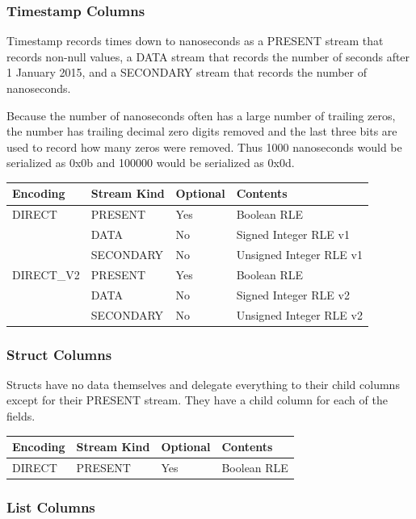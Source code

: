 \documentclass{article}
\begin{document}
\subsubsection{Timestamp Columns}

Timestamp records times down to nanoseconds as a PRESENT stream that
records non-null values, a DATA stream that records the number of
seconds after 1 January 2015, and a SECONDARY stream that records the
number of nanoseconds. 

Because the number of nanoseconds often has a large number of trailing
zeros, the number has trailing decimal zero digits removed and the
last three bits are used to record how many zeros were removed. Thus
1000 nanoseconds would be serialized as 0x0b and 100000 would be
serialized as 0x0d.

\vspace{10pt}
\begin{tabular}{| l | l | l | l |}
\hline
Encoding & Stream Kind & Optional & Contents \\
\hline
DIRECT & PRESENT   & Yes & Boolean RLE\\
       & DATA      & No  & Signed Integer RLE v1\\
       & SECONDARY & No  & Unsigned Integer RLE v1\\
\hline
DIRECT\_V2 & PRESENT   & Yes & Boolean RLE\\
           & DATA      & No  & Signed Integer RLE v2\\
           & SECONDARY & No  & Unsigned Integer RLE v2\\
\hline
\end{tabular}

\subsubsection{Struct Columns}

Structs have no data themselves and delegate everything to their child
columns except for their PRESENT stream. They have a child column
for each of the fields.

\vspace{10pt}
\begin{tabular}{| l | l | l | l |}
\hline
Encoding & Stream Kind & Optional & Contents \\
\hline
DIRECT & PRESENT & Yes & Boolean RLE\\
\hline
\end{tabular}

\subsubsection{List Columns}
\end{document}
